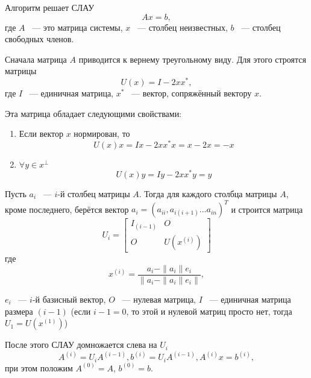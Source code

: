 \documentclass[oneside,final,14pt]{extreport}
\begin{document}
Алгоритм решает СЛАУ
\begin{equation}
Ax=b,
\end{equation}
где $A$ ~--- это матрица системы, $x$ ~--- столбец неизвестных, $b$ ~--- столбец свободных членов.

Сначала матрица $A$ приводится к вернему треугольному виду. Для этого строятся матрицы
\begin{equation}
U(x) = I - 2 x x^*,
\end{equation}
где $I$ ~--- единичная матрица, $x^*$ ~--- вектор, сопряжённый вектору $x$.

Эта матрица обладает следующими свойствами:
\begin{enumerate}

\item Если вектор $x$ нормирован, то
\begin{equation}\label{eq1}
U(x) x = I x - 2 x x^* x = x - 2 x = -x
\end{equation}

\item $ \forall y \in x^\perp $
\begin{equation}\label{eq2}
U(x) y = I y - 2 x x^* y = y
\end{equation}

\end{enumerate}

Пусть $a_i$ ~--- $i$-й столбец матрицы $A$. Тогда для каждого столбца матрицы $A$, кроме последнего, берётся вектор $a_i=(a_{ii}, a_{i(i+1)} ... a_{in})^T$ 
и строится матрица
\begin{equation}
U_i = \begin{bmatrix}
I_{(i-1)} & O\\
O & U(x^{(i)})
\end{bmatrix}
\end{equation}
где
\begin{equation}\label{eq3}
x^{(i)} = \frac{a_i - \| a_i \| e_i}{\| a_i - \| a_i \| e_i \|},
\end{equation}

$e_i$ ~--- $i$-й базисный вектор, $O$ ~--- нулевая матрица, $I$ ~--- единичная матрица размера $(i-1)$ (если $i-1=0$, то этой и нулевой матриц просто нет, тогда 
$U_1 = U(x^{(1)})$)

После этого СЛАУ домножается слева на $U_i$
\begin{equation}
A^{(i)} = U_i A^{(i-1)},
b^{(i)} = U_i A^{(i-1)},
A^{(i)} x = b^{(i)},
\end{equation}
при этом положим $A^{(0)} = A$, $b^{(0)} = b$.
\end{document}
